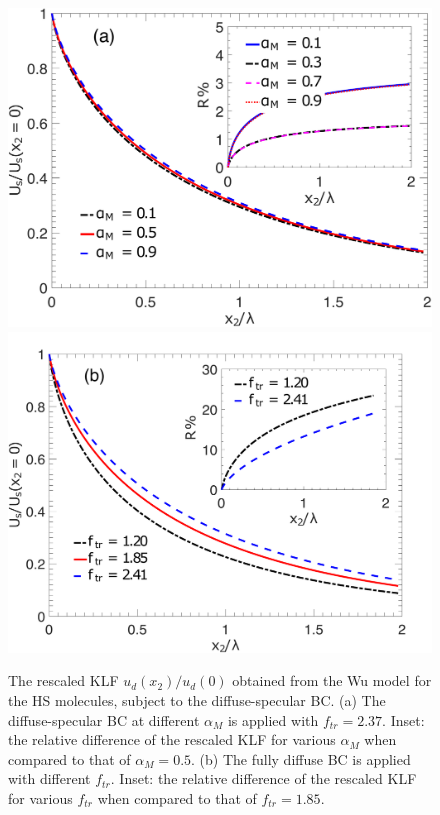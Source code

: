 \begin{figure}[t]
	\centering
	\includegraphics[scale=0.25]{SlipJump/IMG/KLF_d2Z5.pdf}
	\hskip 20pt\includegraphics[scale=0.25]{SlipJump/IMG/Ud_ftr_d2.pdf}
	\caption{\label{fig:Ud_rotation}The rescaled KLF $u_d(x_2)/u_d(0)$ obtained from the Wu model for the HS molecules, subject to the diffuse-specular BC. (a)  The diffuse-specular BC at different $\alpha_M$ is applied with $f_{tr}=2.37$. Inset: the relative difference of the rescaled KLF for various $\alpha_M$ when compared to that of $\alpha_M=0.5$. (b) The fully diffuse BC is applied with different $f_{tr}$. Inset: the relative difference of the rescaled KLF for various $f_{tr}$ when compared to that of $f_{tr}=1.85$.}
\end{figure}





